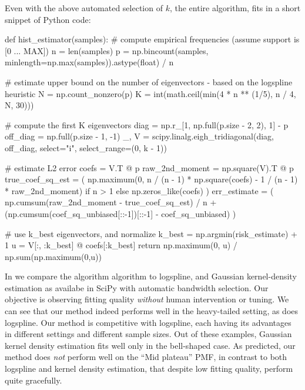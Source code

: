 \documentclass[10pt]{article} %
\begin{document}
Even with the above automated selection of $k$, the entire algorithm, fits in a short snippet of Python code:
\begin{pycode}
def hist_estimator(samples):
    # compute empirical frequencies (assume support is [0 ... MAX])
    n = len(samples)
    p = np.bincount(samples, minlength=np.max(samples)).astype(float) / n

    # estimate upper bound on the number of eigenvectors - based on the logspline heuristic
    N = np.count_nonzero(p)
    K = int(math.ceil(min(4 * n ** (1/5), n / 4, N, 30)))

    # compute the first K eigenvectors
    diag = np.r_[1, np.full(p.size - 2, 2), 1] - p
    off_diag = np.full(p.size - 1, -1)
    _, V = scipy.linalg.eigh_tridiagonal(diag, off_diag, select="i", select_range=(0, k - 1))

    # estimate L2 error
    coefs = V.T @ p
    raw_2nd_moment = np.square(V).T @ p
    true_coef_sq_est = (
        np.maximum(0, n / (n - 1) * np.square(coefs) - 1 / (n - 1) * raw_2nd_moment) if n > 1
        else np.zeros_like(coefs)
    )
    err_estimate = (
        np.cumsum(raw_2nd_moment - true_coef_sq_est) / n +
        (np.cumsum(coef_sq_unbiased[::-1])[::-1] - coef_sq_unbiased)
    )

    # use k_best eigenvectors, and normalize
    k_best = np.argmin(risk_estimate) + 1
    u = V[:, :k_best] @ coefs[:k_best]
    return np.maximum(0, u) / np.sum(np.maximum(0,u))
\end{pycode}

In  we compare the algorithm algorithm to logspline, and Gaussian kernel-density estimation as availabe in SciPy \citep{scipy} with automatic bandwidth selection. Our objective is observing fitting quality \emph{without} human intervention or tuning. We can see that our method indeed performs well in the heavy-tailed setting, as does logspline. Our method is competitive with logspline, each having its advantages in different settings and different sample sizes. Out of these examples, Gaussian kernel density estimation fits well only in the bell-shaped case. As predicted, our method does \emph{not} perform well on the ``Mid plateau'' PMF, in contrast to both logspline and kernel density estimation, that despite low fitting quality, perform quite gracefully.
\end{document}
